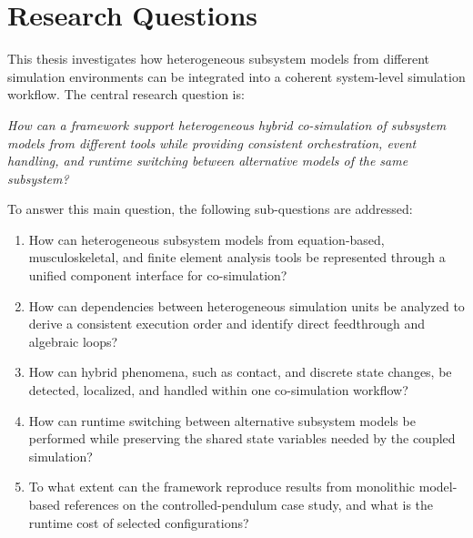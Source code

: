 \section{Research Questions}
\label{sec:intro_research_questions}

This thesis investigates how heterogeneous subsystem models from different simulation environments can be integrated into a coherent system-level simulation workflow.
The central research question is:

\textit{How can a framework support heterogeneous hybrid co-simulation of subsystem models from different tools while providing consistent orchestration, event handling, and runtime switching between alternative models of the same subsystem?}

To answer this main question, the following sub-questions are addressed:

\begin{enumerate}
    \item[\textbf{RQ1}] How can heterogeneous subsystem models from equation-based, musculoskeletal, and finite element analysis tools be represented through a unified component interface for co-simulation?

    \item[\textbf{RQ2}] How can dependencies between heterogeneous simulation units be analyzed to derive a consistent execution order and identify direct feedthrough and algebraic loops?

    \item[\textbf{RQ3}] How can hybrid phenomena, such as contact, and discrete state changes, be detected, localized, and handled within one co-simulation workflow?

    \item[\textbf{RQ4}] How can runtime switching between alternative subsystem models be performed while preserving the shared state variables needed by the coupled simulation?
    
    \item[\textbf{RQ5}] To what extent can the framework reproduce results from monolithic model-based references on the controlled-pendulum case study, and what is the runtime cost of selected configurations?

\end{enumerate}